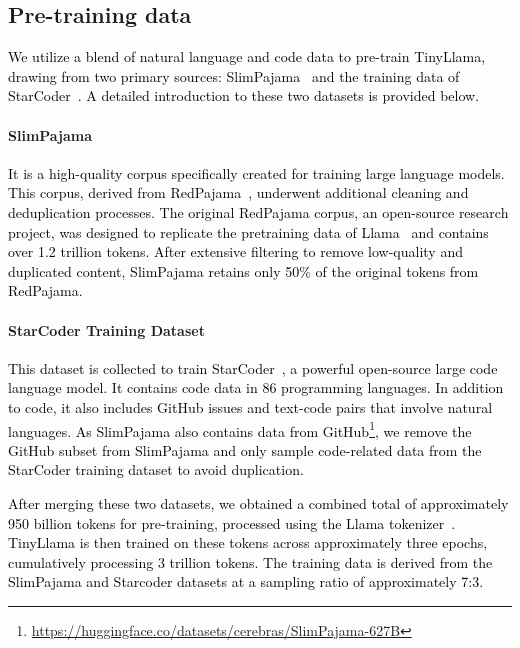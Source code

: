 \documentclass{article}
\begin{document}
\subsection{Pre-training data}
\vspace{-0.2em}
\textcolor{black}{
%
We utilize a blend of natural language and code data to pre-train TinyLlama, drawing from two primary sources:
    SlimPajama~\citep{cerebras2023slimpajama} and the training data of StarCoder~\citep{li2023starcoder}.
%
A detailed introduction to these two datasets is provided below.
}
%
\vspace{-1em}
\paragraph{SlimPajama}

\textcolor{black}{
It is a high-quality corpus specifically created for training large language models.
%
This corpus, derived from RedPajama~\citep{together2023redpajama}, underwent additional cleaning and deduplication processes.
%
The original RedPajama corpus, an open-source research project, was designed to replicate the pretraining data of Llama~\citep{touvron2023llama} and contains over 1.2 trillion tokens.
%
After extensive filtering to remove low-quality and duplicated content, SlimPajama retains only 50\% of the original tokens from RedPajama.
}
%  
\vspace{-1em}
\paragraph{StarCoder Training Dataset}

\textcolor{black}{
This dataset is collected to train StarCoder~\citep{li2023starcoder}, a powerful open-source large code language model. 
It contains code data in 86 programming languages.
%
In addition to code, it also includes GitHub issues and text-code pairs that involve natural languages.
%
As SlimPajama also contains data from GitHub\footnote{\url{https://huggingface.co/datasets/cerebras/SlimPajama-627B}},
    we remove the GitHub subset from SlimPajama and 
        only sample code-related data from the StarCoder training dataset to avoid duplication.
}

\textcolor{black}{
After merging these two datasets, we obtained a combined total of approximately 950 billion tokens for pre-training, 
    processed using the Llama tokenizer~\citep{touvron2023llama,touvron2023llama2}.
%
TinyLlama is then trained on these tokens across approximately three epochs, cumulatively processing 3 trillion tokens.
%
The training data is derived from the SlimPajama and Starcoder datasets at a sampling ratio of approximately 7:3.
}
\end{document}
